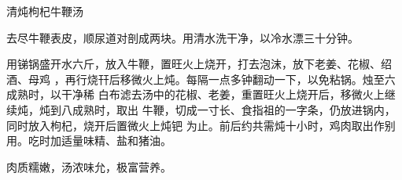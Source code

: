 \begin{recipe}{清炖枸杞牛鞭汤}

\ingredients



\preparation

去尽牛鞭表皮，顺尿道对剖成两块。用清水洗干净，以冷水漂三十分钟。

用锑锅盛开水六斤，放入牛鞭，置旺火上烧开，打去泡沫，放下老姜、花椒、绍酒、母鸡
，再行烧幵后移微火上炖。每隔一点多钟翻动一下，以免粘锅。烛至六成熟时，以干净稀
白布滤去汤中的花椒、老姜，重置旺火上烧开后，移微火上继续炖，炖到八成熟时，取出
牛鞭，切成一寸长、食指祖的一字条，仍放进锅内，同时放入枸杞，烧开后置微火上炖钯
为止。前后约共需炖十小时，鸡肉取出作别用。吃时加适量味精、盐和猪油。

\features

肉质糯嫩，汤浓味允，极富营养。

\end{recipe}

